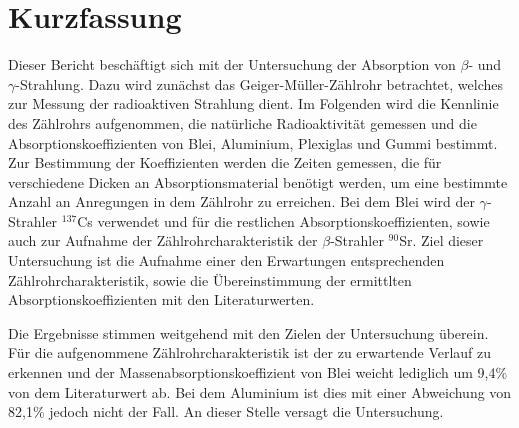 \section{Kurzfassung}

Dieser Bericht beschäftigt sich mit der Untersuchung der Absorption von $\beta$- und $\gamma$-Strahlung.
Dazu wird zunächst das Geiger-Müller-Zählrohr betrachtet, welches zur Messung der radioaktiven Strahlung dient.
Im Folgenden wird die Kennlinie des Zählrohrs aufgenommen, die natürliche Radioaktivität gemessen und die Absorptionskoeffizienten von Blei, Aluminium, Plexiglas und Gummi bestimmt.
Zur Bestimmung der Koeffizienten werden die Zeiten gemessen, die für verschiedene Dicken an Absorptionsmaterial benötigt werden, um eine bestimmte Anzahl an Anregungen in dem Zählrohr zu erreichen.
Bei dem Blei wird der $\gamma$-Strahler $^{137}$Cs verwendet und für die restlichen Absorptionskoeffizienten, sowie auch zur Aufnahme der Zählrohrcharakteristik der $\beta$-Strahler $^{90}$Sr.
Ziel dieser Untersuchung ist die Aufnahme einer den Erwartungen entsprechenden Zählrohrcharakteristik, sowie die Übereinstimmung der ermittlten Absorptionskoeffizienten mit den Literaturwerten.

Die Ergebnisse stimmen weitgehend mit den Zielen der Untersuchung überein.
Für die aufgenommene Zählrohrcharakteristik ist der zu erwartende Verlauf zu erkennen und der Massenabsorptionskoeffizient von Blei weicht lediglich um 9,4\% von dem Literaturwert ab.
Bei dem Aluminium ist dies mit einer Abweichung von 82,1\% jedoch nicht der Fall.
An dieser Stelle versagt die Untersuchung.